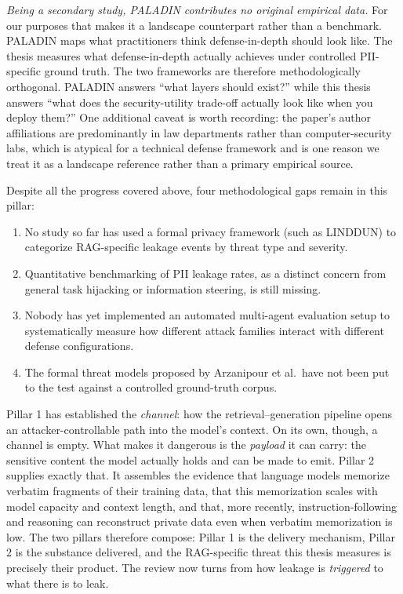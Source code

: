 \documentclass[12pt,a4paper]{report}
\begin{document}
\begin{critbox}
\textit{Being a secondary study, PALADIN contributes no original empirical data.} For our purposes that makes it a landscape counterpart rather than a benchmark. PALADIN maps what practitioners think defense-in-depth should look like. The thesis measures what defense-in-depth actually achieves under controlled PII-specific ground truth. The two frameworks are therefore methodologically orthogonal. PALADIN answers ``what layers should exist?'' while this thesis answers ``what does the security-utility trade-off actually look like when you deploy them?'' One additional caveat is worth recording: the paper's author affiliations are predominantly in law departments rather than computer-security labs, which is atypical for a technical defense framework and is one reason we treat it as a landscape reference rather than a primary empirical source.
\end{critbox}

\begin{gapbox}
Despite all the progress covered above, four methodological gaps remain in this pillar:
\begin{enumerate}[leftmargin=1.5em, itemsep=3pt]
  \item No study so far has used a formal privacy framework (such as LINDDUN) to categorize RAG-specific leakage events by threat type and severity.
  \item Quantitative benchmarking of PII leakage rates, as a distinct concern from general task hijacking or information steering, is still missing.
  \item Nobody has yet implemented an automated multi-agent evaluation setup to systematically measure how different attack families interact with different defense configurations.
  \item The formal threat models proposed by Arzanipour et al.\ have not been put to the test against a controlled ground-truth corpus.
\end{enumerate}
\end{gapbox}

\begin{transitionbox}
Pillar 1 has established the \emph{channel}: how the retrieval--generation pipeline opens an
attacker-controllable path into the model's context. On its own, though, a channel is empty. What
makes it dangerous is the \emph{payload} it can carry: the sensitive content the model actually
holds and can be made to emit. Pillar 2 supplies exactly that. It assembles the evidence that
language models memorize verbatim fragments of their training data, that this memorization scales
with model capacity and context length, and that, more recently, instruction-following and reasoning
can reconstruct private data even when verbatim memorization is low. The two pillars therefore
compose: Pillar 1 is the delivery mechanism, Pillar 2 is the substance delivered, and the RAG-specific
threat this thesis measures is precisely their product. The review now turns from how leakage is
\emph{triggered} to what there is to leak.
\end{transitionbox}
\end{document}
